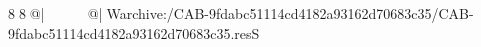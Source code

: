 8  8  @|                                                   @| W   archive:/CAB-9fdabc51114cd4182a93162d70683c35/CAB-9fdabc51114cd4182a93162d70683c35.resS 